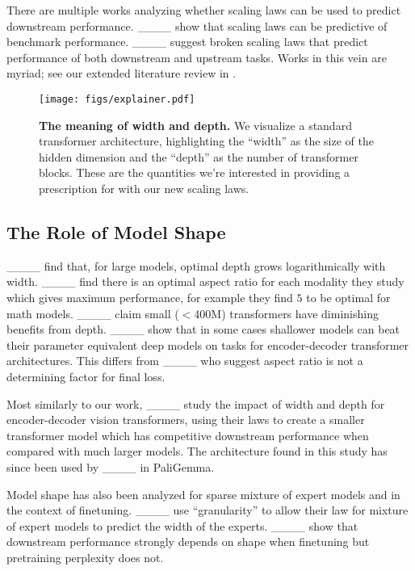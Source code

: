 There are multiple works analyzing whether scaling laws can be used to predict downstream performance.
____ show that scaling laws can be predictive of benchmark performance.
____ %
suggest broken scaling laws that predict performance of both downstream and upstream tasks. Works in this vein are myriad; see our extended literature review in .

\begin{figure}[t!]
    \centering
    \texttt{[image: figs/explainer.pdf]}
    \caption{\textbf{The meaning of width and depth. }We visualize a standard transformer architecture, highlighting the ``width'' as the size of the hidden dimension and the ``depth'' as the number of transformer blocks. These are the quantities we're interested in providing a prescription for with our new scaling laws.}\label{fig:summary}
\end{figure}

\subsection{The Role of Model Shape}
____ find that, for large models, optimal depth grows logarithmically with width. 
____ find there is an optimal aspect ratio for each modality they study which gives maximum performance, for example they find \(5\) to be optimal for math models.
____ claim small ($<$400M) transformers have diminishing benefits from depth.
____ show that in some cases shallower models can beat their parameter equivalent deep models on tasks for encoder-decoder transformer architectures.
This differs from ____ who suggest aspect ratio is not a determining factor for final loss.

Most similarly to our work, ____ study the impact of width and depth for encoder-decoder vision transformers, using their laws to create a smaller transformer model which has competitive downstream performance when compared with much larger models.
The architecture found in this study has since been used by ____ in PaliGemma.

Model shape has also been analyzed for sparse mixture of expert models and in the context of finetuning.
____ use ``granularity'' to allow their law for mixture of expert models to predict the width of the experts. 
____ show that downstream performance strongly depends on shape when finetuning but pretraining perplexity does not.

